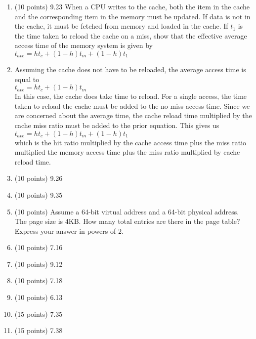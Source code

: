 \documentclass[letterpaper,10pt,onecolumn,titlepage]{article}
\begin{document}
\begin{enumerate}

\item (10 points) 9.23
	When a CPU writes to the cache, both the item in the cache and the corresponding
	item in the memory must be updated. If data is not in the cache, it must be
	fetched from memory and loaded in the cache. If $t_{1}$ is the time taken to
	reload the cache on a miss, show that the effective average access time of the
	memory system is given by \\
	$t_{ave} = ht_{c} + (1-h)t_{m} + (1-h)t_{1}$

\item[\textbullet] Assuming the cache does not have to be reloaded, the average
	access time is equal to \\
	$t_{ave} = ht_{c} + (1-h)t_{m}$ \\
	In this case, the cache does take time to reload. For a single access, the time
	taken to reload the cache must be added to the no-miss access time. Since we are
	concerned about the average time, the cache reload time multiplied by the cache
	miss ratio must be added to the prior equation. This gives us \\
	$t_{ave} = ht_{c} + (1-h)t_{m} + (1-h)t_{1}$ \\
	which is the hit ratio multiplied by the cache access time plus the miss ratio
	multiplied the memory access time plus the miss ratio multiplied by cache reload
	time.

\item (10 points) 9.26

\item (10 points) 9.35

\item (10 points) Assume a 64-bit virtual address and a 64-bit physical address. The page
  size is 4KB. How many total entries are there in the page table? Express your answer in
  powers of 2.

\item (10 points) 7.16 

\item (10 points) 9.12

\item (10 points) 7.18

\item (10 points) 6.13

\item (15 points) 7.35

\item (15 points) 7.38

\end{enumerate}
\end{document}
